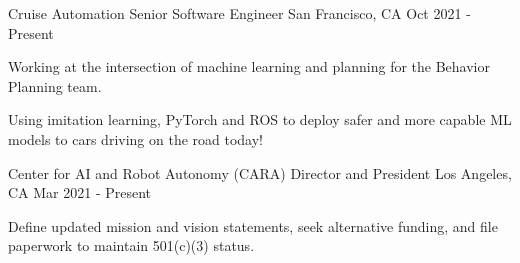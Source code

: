 


\begin{cventries}

\cventry
{Cruise Automation}
{Senior Software Engineer}
{San Francisco, CA}
{Oct 2021 - Present}
{
\begin{cvitems}
\item Working at the intersection of machine learning and planning for the Behavior Planning team.
\item Using imitation learning, PyTorch and ROS to deploy safer and more capable ML models to cars driving on the road today!
\end{cvitems}
}

\cventry
{Center for AI and Robot Autonomy (CARA)}
{Director and President}
{Los Angeles, CA}
{Mar 2021 - Present}
{
\begin{cvitems}
\item Define updated mission and vision statements, seek alternative funding, and file paperwork to maintain 501(c)(3) status.
\end{cvitems}
}


\end{cventries}
